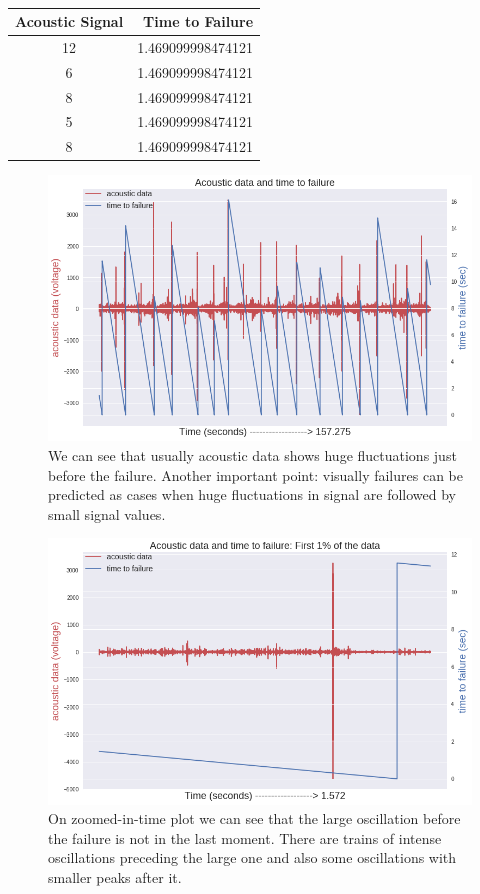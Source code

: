 \documentclass[]{llncs} %
\begin{document}
\begin{table}
	\begin{center}
		\caption{}
		\label{tab:SampleData}
		\begin{tabular}{c|r} 
			\textbf{Acoustic Signal} & \textbf{Time to Failure}\\
			\hline
			12 & 1.469099998474121 \\ 
			6 & 1.469099998474121 \\ 
			8 & 1.469099998474121 \\ 
			5 & 1.469099998474121 \\ 
			8 & 1.469099998474121 \\ 
		\end{tabular}
	\end{center}
\end{table}
\begin{figure}
	\centering
	\includegraphics[width=.9\linewidth]{timeSeries}
	\caption{We can see that usually acoustic data shows huge fluctuations just before the failure. Another important point: visually failures can be predicted as cases when huge fluctuations in signal are followed by small signal values.}
	\label{fig:timeseries}
\end{figure}
\begin{figure}
	\centering
	\includegraphics[width=.9\linewidth]{zoomedInTimePLot}
	\caption{On zoomed-in-time plot we can see that the large oscillation before the failure is not in the last moment. There are trains of intense oscillations preceding the large one and also some oscillations with smaller peaks after it.}
	\label{fig:zoomeInTimePlot}
\end{figure}
\end{document}
